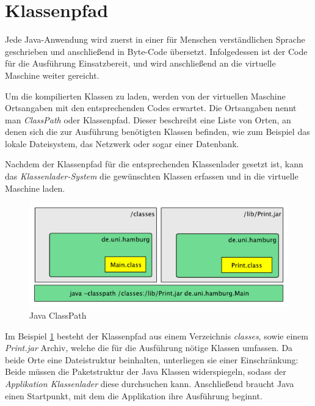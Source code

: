 \section{Klassenpfad} \label{sec:K}

  Jede Java-Anwendung wird zuerst in einer für Menschen verständlichen Sprache geschrieben und anschließend in Byte-Code übersetzt. Infolgedessen ist der Code für die Ausführung Einsatzbereit, und wird anschließend an die virtuelle Maschine weiter gereicht.

  Um die kompilierten Klassen zu laden, werden von der virtuellen Maschine Ortsangaben mit den entsprechenden Codes erwartet. Die Ortsangaben nennt man \textit{ClassPath} oder Klassenpfad. Dieser beschreibt eine Liste von Orten, an denen sich die zur Ausführung benötigten Klassen befinden, wie zum Beispiel das lokale Dateisystem, das Netzwerk oder sogar einer Datenbank. 

  Nachdem der Klassenpfad für die entsprechenden Klassenlader gesetzt ist, kann das \textit{Klassenlader-System} die gewünschten Klassen erfassen und in die virtuelle Maschine laden.

  \begin{figure}[h]
    \includegraphics[width=\textwidth]{material/images/Classpath2.pdf}
    \caption{Java ClassPath}
    \label{fig:cps}
  \end{figure}

  Im Beispiel \ref{fig:cps} besteht der Klassenpfad aus einem Verzeichnis \textit{classes}, sowie einem \textit{Print.jar} Archiv, welche die für die Ausführung nötige Klassen umfassen. Da beide Orte eine Dateistruktur beinhalten, unterliegen sie einer Einschränkung: Beide müssen die Paketstruktur der Java Klassen widerspiegeln, sodass der \textit{Applikation Klassenlader} diese durchsuchen kann. Anschließend braucht Java einen Startpunkt, mit dem die Applikation ihre Ausführung beginnt. 

